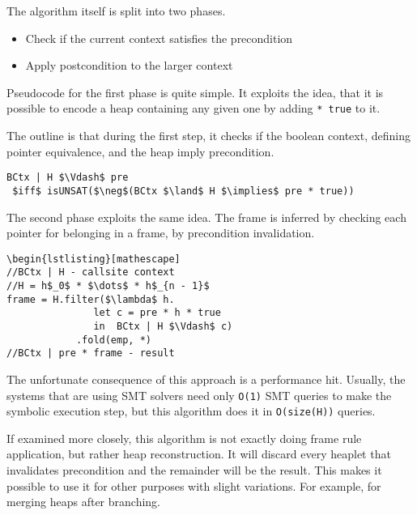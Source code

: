 \documentclass[sigplan,screen,review]{acmart}
\begin{document}
\begin{prooftree}
\end{prooftree}

The algorithm itself is split into two phases. 

\begin{itemize}
    \item Check if the current context satisfies the precondition
    \item Apply postcondition to the larger context
\end{itemize}

Pseudocode for the first phase is quite simple. It exploits the idea, that it is possible to encode a heap containing any given one by adding \texttt{* true} to it. 

The outline is that during the first step, it checks if the boolean context, defining pointer equivalence, and the heap imply precondition.

\begin{lstlisting}[mathescape]
BCtx | H $\Vdash$ pre 
 $iff$ isUNSAT($\neg$(BCtx $\land$ H $\implies$ pre * true))
\end{lstlisting}

The second phase exploits the same idea. The frame is inferred by checking each pointer for belonging in a frame, by precondition invalidation.

\begin{lstlisting}[mathescape]
\begin{lstlisting}[mathescape]
//BCtx | H - callsite context
//H = h$_0$ * $\dots$ * h$_{n - 1}$
frame = H.filter($\lambda$ h. 
               let c = pre * h * true 
               in  BCtx | H $\Vdash$ c)
            .fold(emp, *)
//BCtx | pre * frame - result
\end{lstlisting}

The unfortunate consequence of this approach is a performance hit. Usually, the systems that are using SMT solvers need only \texttt{O(1)} SMT queries to make the symbolic execution step, but this algorithm does it in \texttt{O(size(H))} queries. 

If examined more closely, this algorithm is not exactly doing frame rule application, but rather heap reconstruction. It will discard every heaplet that invalidates precondition and the remainder will be the result. This makes it possible to use it for other purposes with slight variations. For example, for merging heaps after branching. 
\end{document}

